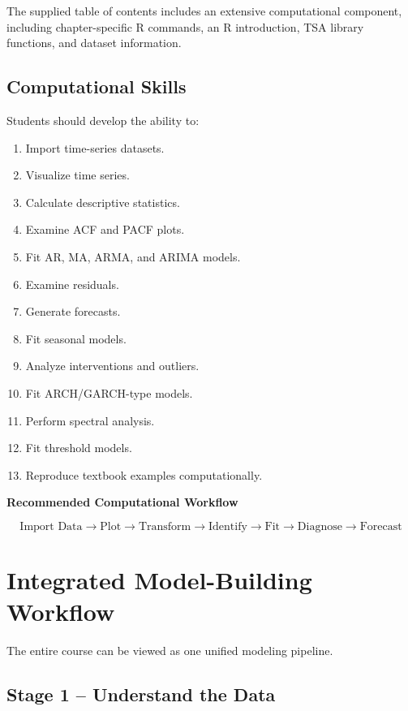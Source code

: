 \documentclass[11pt,a4paper]{article}
\begin{document}
The supplied table of contents includes an extensive computational component,
including chapter-specific R commands, an R introduction, TSA library
functions, and dataset information.

\subsection{Computational Skills}

Students should develop the ability to:

\begin{enumerate}
    \item Import time-series datasets.
    \item Visualize time series.
    \item Calculate descriptive statistics.
    \item Examine ACF and PACF plots.
    \item Fit AR, MA, ARMA, and ARIMA models.
    \item Examine residuals.
    \item Generate forecasts.
    \item Fit seasonal models.
    \item Analyze interventions and outliers.
    \item Fit ARCH/GARCH-type models.
    \item Perform spectral analysis.
    \item Fit threshold models.
    \item Reproduce textbook examples computationally.
\end{enumerate}

\textbf{Recommended Computational Workflow}

\[
\boxed{
\text{Import Data}
\rightarrow
\text{Plot}
\rightarrow
\text{Transform}
\rightarrow
\text{Identify}
\rightarrow
\text{Fit}
\rightarrow
\text{Diagnose}
\rightarrow
\text{Forecast}
}
\]

\section{Integrated Model-Building Workflow}

The entire course can be viewed as one unified modeling pipeline.

\subsection{Stage 1 -- Understand the Data}
\end{document}
